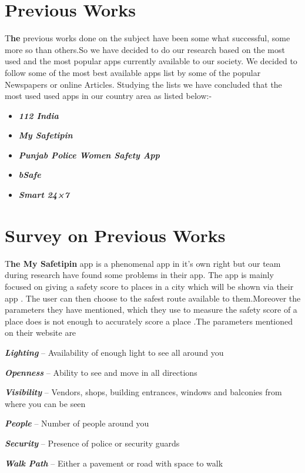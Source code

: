 \documentclass[	DIV=calc,%
							paper=a4,%
							fontsize=12pt,%
							twocolumn]{scrartcl}
\newcommand{\initial}[1]{%
     \lettrine[lines=3,lhang=0.3,nindent=0em]{
     				\color{DarkGoldenrod}
     				{\textsf{#1}}}{}}
\begin{document}
\section*{Previous Works}
\initial{T}\textbf{he} previous works done on the subject have been some what successful, some more so than others.So we have decided to do our research based on the most used and the most popular apps currently available to our society. We decided to follow some of the most best available apps list by some of the popular Newspapers or online Articles. Studying the lists we have concluded that the most used used apps in our country area as listed below:-
\begin{itemize}
	\item{\textbf{\textit{ 112 India}}} 
	\item{\textbf{\textit{ My Safetipin}}}
	\item{\textbf{\textit{ Punjab Police Women Safety App}}}
	\item{\textbf{\textit{bSafe}}}
	\item{\textbf{\textit{Smart 24×7}}}
\end{itemize}
\section*{Survey on Previous Works}
\initial{T}\textbf{he My Safetipin} app is a phenomenal app in it's own right but our team during research have found some problems in their app. The app is mainly focused on giving a safety score to places in a city which will be shown via their app . The user can then choose to the safest route available to them.Moreover the parameters they have mentioned, which they use to measure the safety score  of a place does is not enough to accurately score a place .The parameters mentioned on their website are

\textbf{\textit{Lighting}} – Availability of enough light to see all around you

\textbf{\textit{Openness}} – Ability to see and move in all directions

\textbf{\textit{Visibility}} – Vendors, shops, building entrances, windows and balconies from where you can be seen

\textbf{\textit{People}} – Number of people around you

\textbf{\textit{Security}} – Presence of police or security guards

\textbf{\textit{Walk Path}} – Either a pavement or road with space to walk
\end{document}
